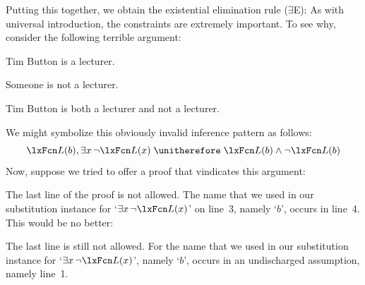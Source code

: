 Putting this together, we obtain the existential elimination rule ($\exists$E):
As with universal introduction, the constraints are extremely important. To see why, consider the following terrible argument:
	\begin{earg}
		\item Tim Button is a lecturer. 
		\item Someone is not a lecturer. 
		\item[\texttherefore] Tim Button is both a lecturer and not a lecturer.
	\end{earg}
We might symbolize this obviously invalid inference pattern as follows:
$$\atom{L}{b}, \exists x\, \enot\atom{L}{x} \therefore \atom{L}{b} \eand \enot \atom{L}{b}$$
Now, suppose we tried to offer a proof that vindicates this argument:
\begin{fitchproof}
	\PR
	\PR
	\open
		\AS
	\close
\ifHTMLtarget
\else
\fi
\end{fitchproof}
The last line of the proof is not allowed. The name that we used in our substitution instance for `$\exists x\, \enot \atom{L}{x}$' on line~3, namely `$b$', occurs in line~4. This would be no better:
\begin{fitchproof}
	\PR
	\PR
	\open
		\AS
	\close
\ifHTMLtarget
\else
\fi
\end{fitchproof}
The last line is still not allowed. For the name that we used in our substitution instance for `$\exists x\, \enot \atom{L}{x}$', namely `$b$', occurs in an undischarged assumption, namely line~1.

